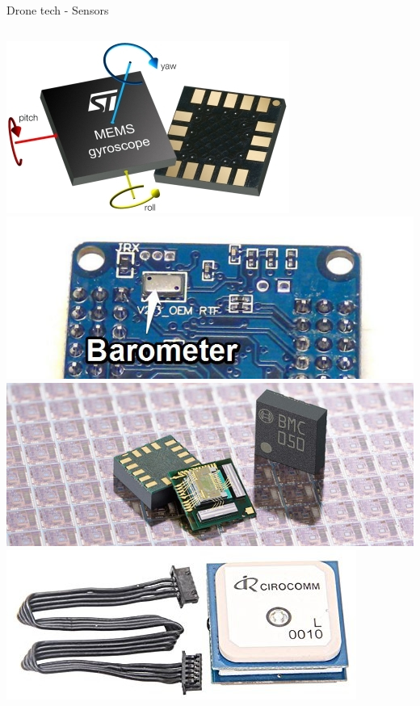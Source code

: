 \documentclass[aspectratio=169]{beamer}
\begin{document}
\begin{frame}{Drone tech - Sensors}
\begin{columns}
	\begin{column}{.19\textwidth}
		\includegraphics[width=0.8\linewidth]{images/acc_gyro.jpg}\\
		\vspace{0.2cm}
		\includegraphics[width=0.8\linewidth]{images/barometer.jpg}\\	
		\vspace{0.2cm}	
		\includegraphics[width=0.8\linewidth]{images/magnetometer.jpg}\\
		\vspace{0.2cm}			
		\includegraphics[width=0.8\linewidth]{images/cyrocomm_gps.jpg}\\

\end{column}
\end{columns}
\end{frame}
\end{document}
